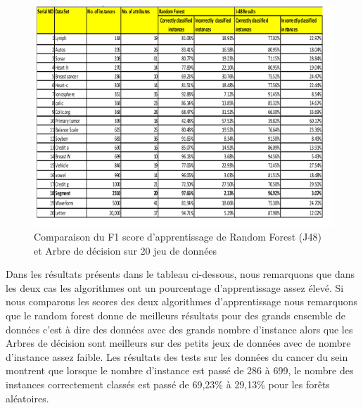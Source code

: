 \newpage
\begin{figure}[h]
\begin{center}
\includegraphics[scale=0.80]{validation_dataset_RF_DT.png}
\caption[Comparaison du F1 score  de Random Forest (J48) et Arbre de décision sur 20 jeu de données]{Comparaison du F1 score d'apprentissage de Random Forest (J48) et Arbre de décision sur 20 jeu de données}
\label{monlabel}
\end{center}
\end{figure}
Dans les résultats présents dans le tableau ci-dessous, nous remarquons que dans les deux cas les algorithmes ont un pourcentage d'apprentissage assez élevé. Si nous comparons les scores des deux algorithmes d'apprentissage nous remarquons que le random forest donne de meilleurs résultats pour des grands ensemble de données c'est à dire des données avec des grands nombre d'instance alors que les Arbres de décision sont meilleurs sur des petits jeux de données avec de nombre d'instance assez faible. Les résultats des tests sur les données du cancer du sein  montrent que lorsque le nombre d'instance est passé de 286 à 699, le nombre des instances correctement classés est passé de 69,23\% à 29,13\% pour les forêts aléatoires.
\newpage

